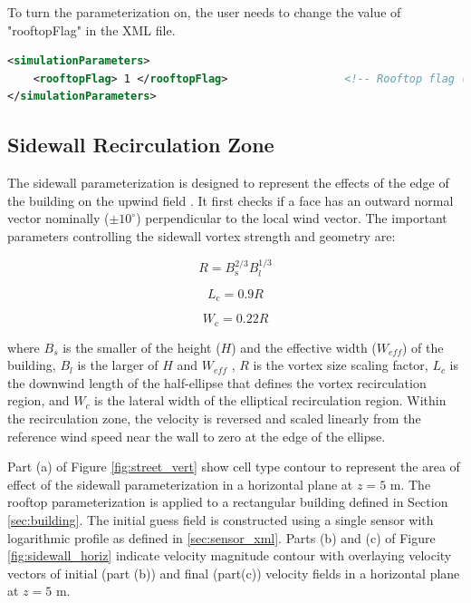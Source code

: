To turn the parameterization on, the user needs to change the value of "rooftopFlag" in the XML file.

\begin{lstlisting}[language=XML]
<simulationParameters>
  	<rooftopFlag> 1 </rooftopFlag> 					<!-- Rooftop flag (0-none, 1-log profile (default)) -->
</simulationParameters>
\end{lstlisting}

\subsection{Sidewall Recirculation Zone}

The sidewall parameterization is designed to represent the effects of the edge of the building on the upwind field \cite{hayati2017comprehensive}. It first checks if a face has an outward normal vector nominally ($\pm 10^{\circ}$)
perpendicular to the local wind vector. The important parameters controlling the sidewall vortex strength and geometry are:

\begin{equation}
R=B_{\mathrm{s}}^{2 / 3} B_{l}^{1 / 3}
\end{equation}

\begin{equation}
L_{\mathrm{c}}=0.9 R
\end{equation}

\begin{equation}
W_{\mathrm{c}}=0.22 R
\end{equation}

where $B_s$ is the smaller of the height ($H$) and the effective width ($W_{eff}$) of the
building, $B_l$ is the larger of $H$ and $W_{eff}$ , $R$ is the vortex size scaling factor, $L_c$ is the downwind length of the half-ellipse that defines the vortex recirculation region, and
$W_c$ is the lateral width of the elliptical recirculation region. Within the recirculation zone, the velocity is reversed and scaled linearly from the reference wind speed near the wall to zero at the edge of the ellipse.

Part (a) of Figure \ref{fig:street_vert} show cell type contour to represent the area of effect of the sidewall parameterization in a horizontal plane at $z=5$ m. The rooftop parameterization is applied to a rectangular building defined in Section \ref{sec:building}. The initial guess field is constructed using a single sensor with logarithmic profile as defined in \ref{sec:sensor_xml}. Parts (b) and (c) of Figure \ref{fig:sidewall_horiz} indicate velocity magnitude contour with overlaying velocity vectors of initial (part (b)) and final (part(c)) velocity fields in a horizontal plane at $z=5$ m.

